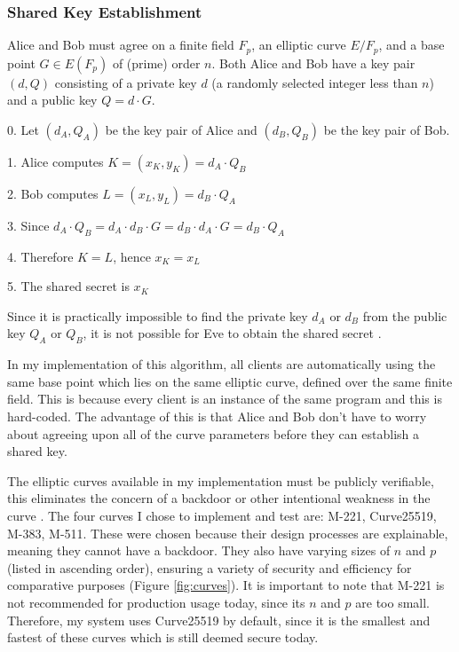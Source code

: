 \documentclass[12pt,a4paper]{article}
\begin{document}
\subsubsection{Shared Key Establishment} \noindent \label{SharedKey}
Alice and Bob must agree on a finite field $F_p$, an elliptic curve $E/F_p$, and a base point $G \in E(F_p)$  of (prime) order $n$.
Both Alice and Bob have a key pair $(d,Q)$ consisting of a private key $d$ (a randomly selected integer less than $n$) 
and a public key $Q = d \cdot G$.

\vspace{1mm}

0. \space Let $(d_A,Q_A)$ be the key pair of Alice and $(d_B,Q_B)$ be the key pair of Bob.

1. \space Alice computes $K = (x_K,y_K) = d_A \cdot Q_B$

2. \space Bob computes $L = (x_L,y_L) = d_B \cdot Q_A$

3. \space Since $d_A \cdot Q_B = d_A \cdot d_B \cdot G = d_B \cdot d_A \cdot G = d_B \cdot Q_A$

4. \space Therefore $K = L$, \space hence $x_K = x_L$

5. \space The shared secret is $x_K$

\vspace{1mm}

Since it is practically impossible to find the private key $d_A$ or $d_B$ from the public key $Q_A$ or $Q_B$, 
it is not possible for Eve to obtain the shared secret \cite{jurivsic1997elliptic,anoop2007elliptic,brown2009standards,silverman2009arithmetic}. 

\vspace{5mm}

In my implementation of this algorithm, all clients are automatically using the same base point which lies 
on the same elliptic curve, defined over the same finite field. 
This is because every client is an instance of the same program and this is hard-coded. 
The advantage of this is that Alice and Bob don't have to worry about agreeing upon all of the 
curve parameters before they can establish a shared key. 

The elliptic curves available in my implementation must be publicly verifiable, this eliminates the concern of a backdoor or other intentional weakness in the curve \cite{bernstein2013safecurves}. 
The four curves I chose to implement and test are: M-221, Curve25519, M-383, M-511. 
These were chosen because their design processes are explainable, meaning they cannot have a backdoor. 
They also have varying sizes of $n$ and $p$ (listed in ascending order), ensuring a variety of security and efficiency for comparative purposes (Figure \ref{fig:curves}). 
It is important to note that M-221 is not recommended for production usage today, since its $n$ and $p$ are too small. 
Therefore, my system uses Curve25519 by default, since it is the smallest and fastest of these curves which is still deemed secure today. 
\end{document}
